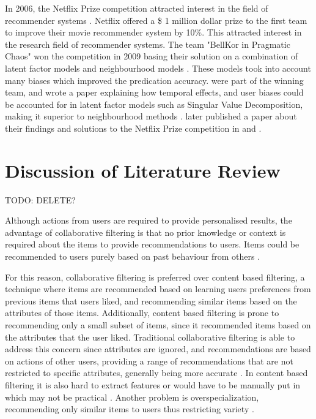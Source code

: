 In 2006, the Netflix Prize competition attracted interest in the field of recommender systems \cite{survey}. Netflix offered a \$ 1 million dollar prize to the first team to improve their movie recommender system by 10\%. This attracted interest in the research field of recommender systems. The team "BellKor in Pragmatic Chaos" won the competition in 2009 basing their solution on a combination of latent factor models and neighbourhood models \cite{winning, survey}. These models took into account many biases which improved the predication accuracy. \citeauthor{koren2009matrix} were part of the winning team, and wrote a paper explaining how temporal effects, and user biases could be accounted for in latent factor models such as Singular Value Decomposition, making it superior to neighbourhood methods \cite{koren2009matrix}. \citeauthor{koren2011} later published a paper about their findings and solutions to the Netflix Prize competition in \cite{koren2011} and \cite{winners}.


\section{Discussion of Literature Review}

TODO: DELETE?

Although actions from users are required to provide personalised results, the advantage of collaborative filtering is that no prior knowledge or context is required about the items to provide recommendations to users. Items could be recommended to users purely based on past behaviour from others \cite{koren2009matrix, schafer2007collaborative}. 

For this reason, collaborative filtering is preferred over content based filtering, a technique where items are recommended based on learning users preferences from previous items that users liked, and recommending similar items based on the attributes of those items. Additionally, content based filtering is prone to recommending only a small subset of items, since it recommended items based on the attributes that the user liked. Traditional collaborative filtering is able to address this concern since attributes are ignored, and recommendations are based on actions of other users, providing a range of recommendations that are not restricted to specific attributes, generally being more accurate \cite{koren2009matrix}.  In content based filtering it is also hard to extract features or would have to be manually put in which may not be practical \cite{toward}. Another problem is overspecialization, recommending only similar items to users thus restricting variety \cite{toward}.



